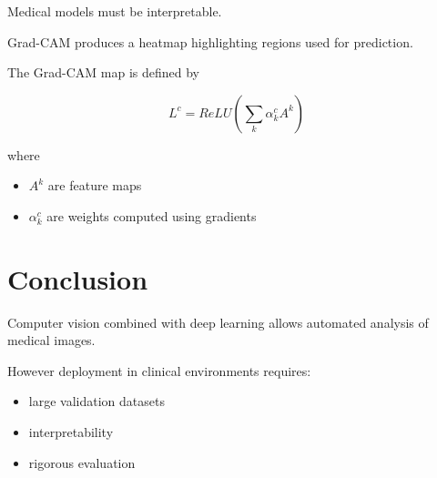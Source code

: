 ﻿\documentclass[11pt]{article}
\begin{document}
Medical models must be interpretable.

Grad-CAM produces a heatmap highlighting regions used for prediction.

The Grad-CAM map is defined by

\[
L^c =
ReLU
\left(
\sum_k
\alpha_k^c A^k
\right)
\]

where

\begin{itemize}
\item $A^k$ are feature maps
\item $\alpha_k^c$ are weights computed using gradients
\end{itemize}

\section{Conclusion}

Computer vision combined with deep learning allows automated analysis of medical images.

However deployment in clinical environments requires:

\begin{itemize}
\item large validation datasets
\item interpretability
\item rigorous evaluation
\end{itemize}
\end{document}
